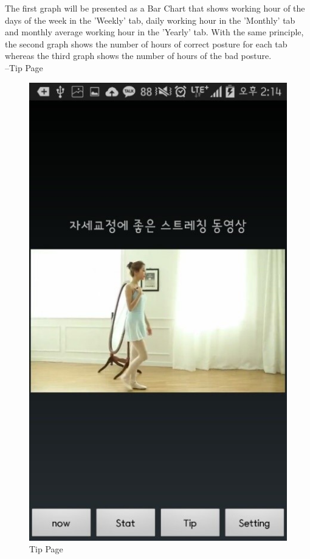 \documentclass[conference]{IEEEtran}
\begin{document}
 The first graph will be presented as a Bar Chart that shows working hour of the days of the week in the 'Weekly' tab, daily working hour in the 'Monthly' tab and monthly average working hour in the 'Yearly' tab.
With the same principle, the second graph shows the number of hours of correct posture for each tab whereas the third graph shows the number of hours of the bad posture.\\

 --Tip Page

\begin{figure}[h]
\begin{center}
    \includegraphics[scale=1]{img_14}
    \caption{Tip Page} 
\end{center}
\end{figure}
\end{document}
